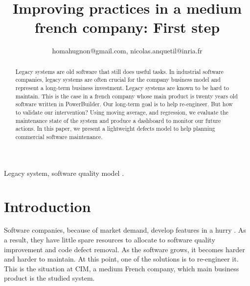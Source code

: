 \documentclass[10pt,conference]{IEEEtran}
\begin{document}
\title{Improving practices in a medium french  company: First step}

\author{
homahugnon@gmail.com, nicolas.anquetil@inria.fr}


\maketitle

\begin{abstract}
Legacy systems are old software that still does useful tasks.
In industrial software companies, legacy systems are often crucial for the company business model and represent a long-term business investment.
Legacy systems are known to be hard to maintain.
This is the case in a french company whose main product is twenty years old software written in PowerBuilder.
Our long-term goal is to help re-engineer.
But how to validate our intervention?
Using moving average, and regression, we evaluate the maintenance state of the system and produce a dashboard to monitor our future actions.
 In this paper, we present a lightweight defects model to help planning commercial software maintenance.
\end{abstract}

\begin{IEEEkeywords}
Legacy system, software quality model .
\end{IEEEkeywords}

\section{Introduction}
Software companies, because of market demand, develop features  in a hurry .
As a result, they have little spare resources to allocate to software quality improvement and code defect removal.
As the software grows,  it becomes harder and harder to maintain.
At this point, one of the solutions is to re-engineer it. 
This is the situation at CIM, a medium French company, which main business product  is the studied system.
\end{document}
